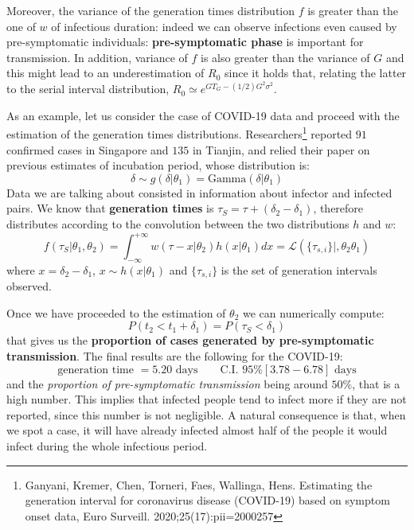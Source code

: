 \documentclass[../main/main.tex]{subfiles}
\begin{document}
Moreover, the variance of the generation times distribution $f$ is greater than the one of $w$ of infectious duration: indeed we can observe infections even caused by pre-symptomatic individuals: \textbf{pre-symptomatic phase} is important for transmission. In addition, variance of $f$ is also greater than the variance of $G$ and this might lead to an underestimation of $R_0$ since it holds that, relating the latter to the serial interval distribution, $R_0 \simeq e^{GT_G - (1/2)G^2 \sigma^2}$.

As an example, let us consider the case of COVID-19 data and proceed with the estimation of the generation times distributions. Researchers\footnote{Ganyani, Kremer, Chen, Torneri, Faes, Wallinga, Hens. Estimating the generation interval for coronavirus disease (COVID-19) based on symptom onset data, Euro Surveill. 2020;25(17):pii=2000257} reported $91$ confirmed cases in Singapore and $135$ in Tianjin, and relied their paper on previous estimates of incubation period, whose distribution is:
\begin{equation}
    \delta \sim g(\delta|\theta_1) = \text{Gamma}(\delta|\theta_1)
\end{equation}
Data we are talking about consisted in information about infector and infected pairs. We know that \textbf{generation times} is $\tau_S = \tau + (\delta_2 - \delta_1)$, therefore distributes according to the convolution between the two distributions $h$ and $w$:
\begin{equation}
    f(\tau_S|\theta_1, \theta_2) = \int_{-\infty}^{+\infty} w(\tau - x|\theta_2) h(x|\theta_1) dx = \mathcal{L}(\{\tau_{s,i}\}|, \theta_2 \theta_1)
\end{equation}
where $x = \delta_2 - \delta_1$, $x\sim h(x|\theta_1)$ and $\{\tau_{s,i}\}$ is the set of generation intervals observed.

Once we have proceeded to the estimation of $\theta_2$ we can numerically compute:
\begin{equation}
    P(t_2 < t_1 + \delta_1) = P(\tau_S < \delta_1)
\end{equation}
that gives us the \textbf{proportion of cases generated by pre-symptomatic transmission}. The final results are the following for the COVID-19:
\begin{equation}
    \text{generation time } = 5.20 \text{ days} \qquad \text{C.I. 95\% }[3.78-6.78] \text{ days}
\end{equation}
and the \textit{proportion of pre-symptomatic transmission} being around $50\%$, that is a high number. This implies that infected people tend to infect more if they are not reported, since this number is not negligible. A natural consequence is that, when we spot a case, it will have already infected almost half of the people it would infect during the whole infectious period.
\end{document}
